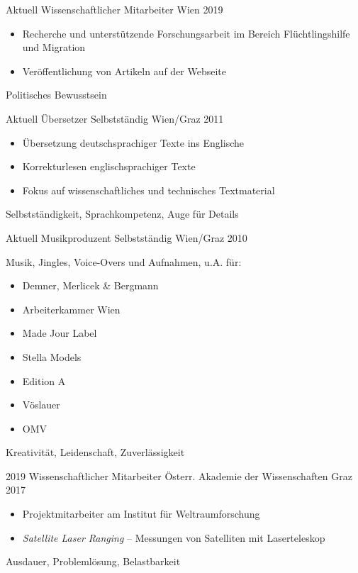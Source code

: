 %
%


\begin{experiences}
	\experience
	{Aktuell}
	{Wissenschaftlicher Mitarbeiter}
	{}
	{Wien}
	{2019}
	{
		\begin{itemize}
			\item Recherche und unterstützende Forschungsarbeit im Bereich
			      Flüchtlingshilfe und Migration
			\item Veröffentlichung von Artikeln auf der Webseite
		\end{itemize}
	}
	{Politisches Bewusstsein}

	\emptySeparator

	\experience
	{Aktuell}
	{Übersetzer}
	{Selbstständig}
	{Wien/Graz}
	{2011}
	{
		\begin{itemize}
			\item Übersetzung deutschsprachiger Texte ins Englische
			\item Korrekturlesen englischsprachiger Texte
			\item Fokus auf wissenschaftliches und technisches Textmaterial
		\end{itemize}
	}
	{Selbstständigkeit, Sprachkompetenz, Auge für Details}

	\emptySeparator

	\experience
	{Aktuell}
	{Musikproduzent}
	{Selbstständig}
	{Wien/Graz}
	{2010}
	{
		Musik, Jingles, Voice-Overs und Aufnahmen, u.A. für:
		\begin{itemize}
			\item Demner, Merlicek \& Bergmann
			\item Arbeiterkammer Wien
			\item Made Jour Label
			\item Stella Models
			\item Edition A
			\item Vöslauer
			\item OMV
		\end{itemize}
	}
	{Kreativität, Leidenschaft, Zuverlässigkeit}

	\emptySeparator

	\experience
	{2019}
	{Wissenschaftlicher Mitarbeiter}
	{Österr. Akademie der Wissenschaften}
	{Graz}
	{2017}
	{
		\begin{itemize}
			\item Projektmitarbeiter am Institut für Weltraumforschung
			\item \textit{Satellite Laser Ranging} –
			      Messungen von Satelliten mit Laserteleskop
		\end{itemize}
	}
	{Ausdauer, Problemlösung, Belastbarkeit}


\end{experiences}
